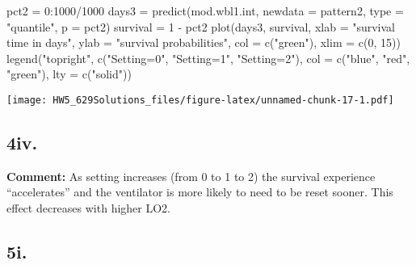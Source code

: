 \documentclass[
]{article}
\newenvironment{Shaded}{\begin{snugshade}}{\end{snugshade}}
\newcommand{\AttributeTok}[1]{\textcolor[rgb]{0.77,0.63,0.00}{#1}}
\newcommand{\DecValTok}[1]{\textcolor[rgb]{0.00,0.00,0.81}{#1}}
\newcommand{\FunctionTok}[1]{\textcolor[rgb]{0.00,0.00,0.00}{#1}}
\newcommand{\NormalTok}[1]{#1}
\newcommand{\OtherTok}[1]{\textcolor[rgb]{0.56,0.35,0.01}{#1}}
\newcommand{\SpecialCharTok}[1]{\textcolor[rgb]{0.00,0.00,0.00}{#1}}
\newcommand{\StringTok}[1]{\textcolor[rgb]{0.31,0.60,0.02}{#1}}
\begin{document}
\begin{Shaded}
\begin{Highlighting}[]
\NormalTok{pct2 }\OtherTok{=} \DecValTok{0}\SpecialCharTok{:}\DecValTok{1000}\SpecialCharTok{/}\DecValTok{1000}
\NormalTok{days3 }\OtherTok{=} \FunctionTok{predict}\NormalTok{(mod.wbl1.int, }\AttributeTok{newdata =}\NormalTok{ pattern2, }\AttributeTok{type =} \StringTok{"quantile"}\NormalTok{, }\AttributeTok{p =}\NormalTok{ pct2)}
\NormalTok{survival }\OtherTok{=} \DecValTok{1} \SpecialCharTok{{-}}\NormalTok{ pct2}
\FunctionTok{plot}\NormalTok{(days3, survival, }\AttributeTok{xlab =} \StringTok{"survival time in days"}\NormalTok{, }\AttributeTok{ylab =} \StringTok{"survival}
\StringTok{     probabilities"}\NormalTok{,}
    \AttributeTok{col =} \FunctionTok{c}\NormalTok{(}\StringTok{"green"}\NormalTok{), }\AttributeTok{xlim =} \FunctionTok{c}\NormalTok{(}\DecValTok{0}\NormalTok{, }\DecValTok{15}\NormalTok{))}
\FunctionTok{legend}\NormalTok{(}\StringTok{"topright"}\NormalTok{, }\FunctionTok{c}\NormalTok{(}\StringTok{"Setting=0"}\NormalTok{, }\StringTok{"Setting=1"}\NormalTok{, }\StringTok{"Setting=2"}\NormalTok{), }\AttributeTok{col =} \FunctionTok{c}\NormalTok{(}\StringTok{"blue"}\NormalTok{, }\StringTok{"red"}\NormalTok{,}
    \StringTok{"green"}\NormalTok{), }\AttributeTok{lty =} \FunctionTok{c}\NormalTok{(}\StringTok{"solid"}\NormalTok{))}
\end{Highlighting}
\end{Shaded}

\texttt{[image: HW5\_629Solutions\_files/figure-latex/unnamed-chunk-17-1.pdf]}

\hypertarget{iv.}{%
\subsection{4iv.}\label{iv.}}

\textbf{Comment:} As setting increases (from 0 to 1 to 2) the survival
experience ``accelerates'' and the ventilator is more likely to need to
be reset sooner. This effect decreases with higher LO2.

\hypertarget{i.-2}{%
\subsection{5i.}\label{i.-2}}
\end{document}

